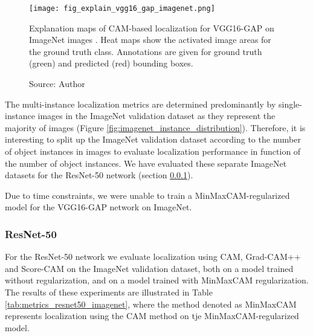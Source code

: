\begin{figure}[h]
\begin{center}
    \texttt{[image: fig\_explain\_vgg16\_gap\_imagenet.png]}
    \caption[Explanation maps of CAM-based localization for VGG16-GAP on ImageNet images]{Explanation maps of CAM-based localization for VGG16-GAP on ImageNet images
. Heat maps show the activated image areas for the ground truth class. Annotations are given for ground truth (green) and predicted (red) bounding boxes.}
    \caption*{Source: Author}
    \label{fig:explain_vgg16_gap_imagenet}
\end{center}
\end{figure}

The multi-instance localization metrics are determined predominantly by single-instance images in the ImageNet validation dataset as they represent the majority of images (Figure \ref{fig:imagenet_instance_distribution}). Therefore, it is interesting to split up the ImageNet validation dataset according to the number of object instances in images to evaluate localization performance in function of the number of object instances. We have evaluated these separate ImageNet datasets for the ResNet-50 network (section \ref{sec:exp_resnet50_imagenet}).

Due to time constraints, we were unable to train a MinMaxCAM-regularized model for the VGG16-GAP network on ImageNet.

\subsubsection{ResNet-50} \label{sec:exp_resnet50_imagenet}

For the ResNet-50 network we evaluate localization using CAM, Grad-CAM++ and Score-CAM on the ImageNet validation dataset, both on a model trained without regularization, and on a model trained with MinMaxCAM regularization. The results of these experiments are illustrated in Table \ref{tab:metrics_resnet50_imagenet}, where the method denoted as MinMaxCAM represents localization using the CAM method on tje MinMaxCAM-regularized model. 

